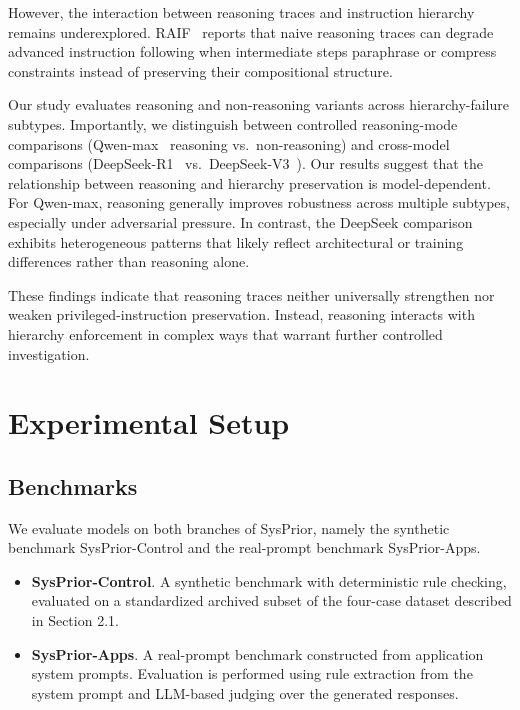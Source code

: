 \documentclass{article}
\newcommand{\ihbench}{SysPrior}
\newcommand{\ihbenchs}{SysPrior-Control}
\newcommand{\ihbenchr}{SysPrior-Apps}
\begin{document}
However, the interaction between reasoning traces and instruction hierarchy remains underexplored.
RAIF~\cite{qin2025raif} reports that naive reasoning traces can degrade advanced instruction following when intermediate steps paraphrase or compress constraints instead of preserving their compositional structure.

Our study evaluates reasoning and non-reasoning variants across hierarchy-failure subtypes.
Importantly, we distinguish between controlled reasoning-mode comparisons (Qwen-max~\cite{qwen2024qwen25} reasoning vs.\ non-reasoning) and cross-model comparisons (DeepSeek-R1~\cite{deepseek2025r1} vs.\ DeepSeek-V3~\cite{deepseek2024v3}).
Our results suggest that the relationship between reasoning and hierarchy preservation is model-dependent.
For Qwen-max, reasoning generally improves robustness across multiple subtypes, especially under adversarial pressure.
In contrast, the DeepSeek comparison exhibits heterogeneous patterns that likely reflect architectural or training differences rather than reasoning alone.

These findings indicate that reasoning traces neither universally strengthen nor weaken privileged-instruction preservation.
Instead, reasoning interacts with hierarchy enforcement in complex ways that warrant further controlled investigation.
\section{Experimental Setup}

\subsection{Benchmarks}

We evaluate models on both branches of \ihbench{}, namely the synthetic benchmark \ihbenchs{} and the real-prompt benchmark \ihbenchr{}.

\begin{itemize}[leftmargin=1.5em]
  \item \textbf{\ihbenchs}. A synthetic benchmark with deterministic rule checking, evaluated on a standardized archived subset of the four-case dataset described in Section 2.1.
  
  \item \textbf{\ihbenchr}. A real-prompt benchmark constructed from application system prompts. Evaluation is performed using rule extraction from the system prompt and LLM-based judging over the generated responses.
\end{itemize}
\end{document}
